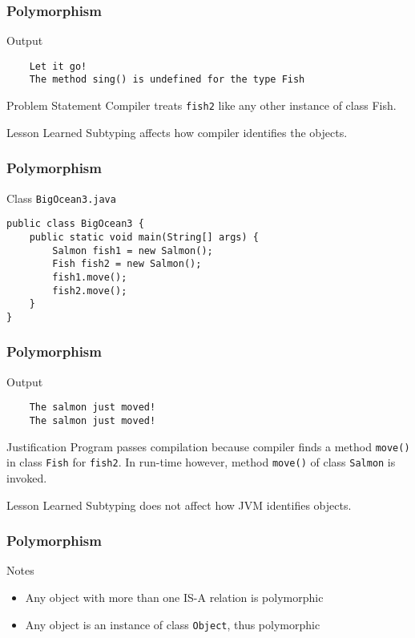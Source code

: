 \documentclass[10pt, compress]{beamer}
\begin{document}
\begin{frame}[fragile]
	\frametitle{Polymorphism}
	\begin{block}{Output}
\begin{verbatim}	Let it go!
	The method sing() is undefined for the type Fish
\end{verbatim}
	\end{block}
	\begin{block}{Problem Statement}
		Compiler treats \texttt{fish2} like any other instance of class Fish.
	\end{block}
	\begin{block}{Lesson Learned}
		Subtyping affects how compiler identifies the objects.
	\end{block}
\end{frame}

\begin{frame}[fragile]
	\frametitle{Polymorphism}
	\begin{block}{Class \texttt{BigOcean3.java}}
		\begin{verbatim}
public class BigOcean3 {
	public static void main(String[] args) {
		Salmon fish1 = new Salmon();
		Fish fish2 = new Salmon();
		fish1.move();
		fish2.move();
	}
}
		\end{verbatim}
	\end{block}
\end{frame}

\begin{frame}[fragile]
	\frametitle{Polymorphism}
	\begin{block}{Output}
\begin{verbatim}	The salmon just moved!
	The salmon just moved!
\end{verbatim}
	\end{block}
	\begin{block}{Justification}
		Program passes compilation because compiler finds a method \texttt{move()} in class \texttt{Fish} for \texttt{fish2}. In run-time however, method \texttt{move()} of class \texttt{Salmon} is invoked.
	\end{block}
	\begin{block}{Lesson Learned}
		Subtyping does not affect how JVM identifies objects.
	\end{block}
\end{frame}

\begin{frame}[fragile]
	\frametitle{Polymorphism}
	\begin{block}{Notes}
		\begin{itemize}
			\item[] Any object with more than one IS-A relation is polymorphic
			\item[] Any object is an instance of class \texttt{Object}, thus polymorphic
		\end{itemize}
	\end{block}
\end{frame}

\end{document}
